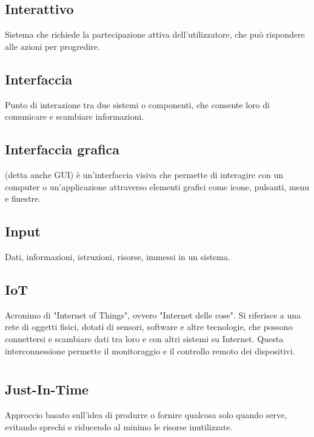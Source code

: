 \documentclass[a4paper,12pt]{article}
\begin{document}
          \subsection*{Interattivo}
			Sistema che richiede la partecipazione attiva dell'utilizzatore, che può rispondere alle azioni per progredire.
          \subsection*{Interfaccia}
			Punto di interazione tra due sistemi o componenti, che consente loro di comunicare e scambiare informazioni.
          \subsection*{Interfaccia grafica}
			(detta anche GUI) è un'interfaccia visiva che permette di interagire con un computer o un'applicazione attraverso elementi grafici come icone, pulsanti, menu e finestre.
          \subsection*{Input}
			Dati, informazioni, istruzioni, risorse, immessi in un sistema.
          \subsection*{IoT}
			Acronimo di "Internet of Things", ovvero "Internet delle cose". Si riferisce a una rete di oggetti fisici, dotati di sensori, software e altre tecnologie, che possono connettersi e scambiare dati tra loro e con altri sistemi su Internet. Questa interconnessione permette il monitoraggio e il controllo remoto dei dispositivi.
        
\newpage
        \section{}
        
          \subsection*{Just-In-Time}
			Approccio basato sull'idea di produrre o fornire qualcosa solo quando serve, evitando sprechi e riducendo al minimo le risorse inutilizzate.
        
\newpage
        \section{}
        
\end{document}
